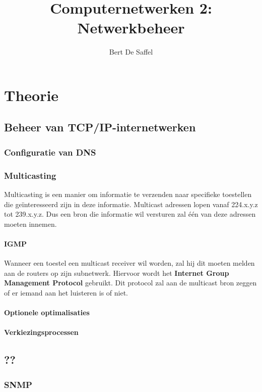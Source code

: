 \documentclass{report}
\title{Computernetwerken 2: Netwerkbeheer}
\author{Bert De Saffel}
\begin{document}
\maketitle
\tableofcontents


\part{Theorie}
\chapter{Beheer van TCP/IP-internetwerken}
\section{Configuratie van DNS}

\section{Multicasting}
Multicasting is een manier om informatie te verzenden naar specifieke toestellen die geïnteresseerd zijn in deze informatie. Multicast adressen lopen vanaf 224.x.y.z tot 239.x.y.z. Dus een bron die informatie wil versturen zal één van deze adressen moeten innemen.

\subsection{IGMP}
Wanneer een toestel een multicast receiver wil worden, zal hij dit moeten melden aan de routers op zijn subnetwerk. Hiervoor wordt het \textbf{Internet Group Management Protocol} gebruikt. Dit protocol zal aan de multicast bron zeggen of er iemand aan het luisteren is of niet. 

\subsection{Optionele optimalisaties}

\subsection{Verkiezingsprocessen}

\chapter{??}
\section{SNMP}
\end{document}
